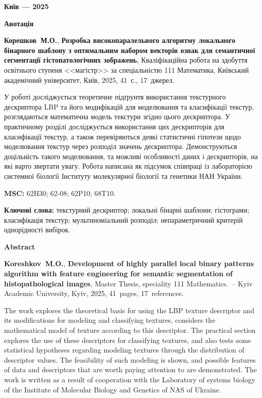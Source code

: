 \documentclass{thesis}
\newcommand{\MyInitialName}{Корешков~М.О.}
\newcommand{\ThesisName}{Розробка високопаралельного алгоритму локального бінарного шаблону з оптимальним набором векторів ознак для семантичної сегментації гістопатологічних зображень}
\newcommand{\NumPages}{41}
\newcommand{\NumCitations}{17}
\newcommand{\MyInitialNameEn}{Koreshkov~M.O.}
\newcommand{\ThesisNameEn}{Development of highly parallel local binary patterns algorithm with feature engineering for semantic segmentation of histopathological images}
\newcommand{\MSC}{62H30; 62-08; 62P10; 68T10.}
\newcommand{\1}{\mathds 1}
\begin{document}
\vfill

\centerline{\bf Київ --- 2025}

\newpage

\begin{center}
\Large \bf Анотація
\end{center}

\noindent
\textbf{\MyInitialName}, \textbf{\ThesisName}, Кваліфікаційна робота на здобуття освітнього ступеня <<магістр>> за спеціальністю 111 Математика, Київський академічний університет, Київ, 2025, \NumPages~с., \NumCitations~джерел.

\bigskip


{ У роботі досліджується теоретичне підґрунтя використання текстурного дескриптора LBP та його модифікацій для моделювання та класифікації текстур, 
розглядаються математична модель текстури згідно цього дескриптора.
У практичному розділі досліджується використання цих дескрипторів для класифікації текстур, 
а також перевіряються деякі статистичні гіпотези щодо моделювання текстур через розподіл значень дескриптора.
Демонструються доцільність такого моделювання, та можливі особливості даних і дескрипторів, на які варто звертати увагу.
Робота написана як підсумок співпраці із лабораторією системної біології Інституту молекулярної біології та генетики НАН України.}

\bigskip

\noindent
{\bf MSC:} \MSC

\bigskip

\noindent
{\bf Ключові слова:} текстурний дескриптор; локальні бінарні шаблони; гістограми; класифікація текстур; мультиноміальний розподіл; непараметричний критерій однорідності вибірок.
\bigskip

\newpage

\begin{center}
\Large \bf Abstract
\end{center}

\noindent
\textbf{\MyInitialNameEn}, \textbf{\ThesisNameEn}, Master Thesis, speciality 111 Mathematics.~--
Kyiv Academic University, Kyiv, 2025, \NumPages~pages, \NumCitations~references.

\bigskip
{ The work explores the theoretical basis for using the LBP texture descriptor and its modifications for modeling and classifying textures,
considers the mathematical model of texture according to this descriptor.
The practical section explores the use of these descriptors for classifying textures,
and also tests some statistical hypotheses regarding modeling textures through the distribution of descriptor values.
The feasibility of such modeling is shown, and possible features of data and descriptors that are worth paying attention to are demonstrated.
The work is written as a result of cooperation with the Laboratory of systems biology of the Institute of Molecular Biology and Genetics of NAS of Ukraine.}
\end{document}
